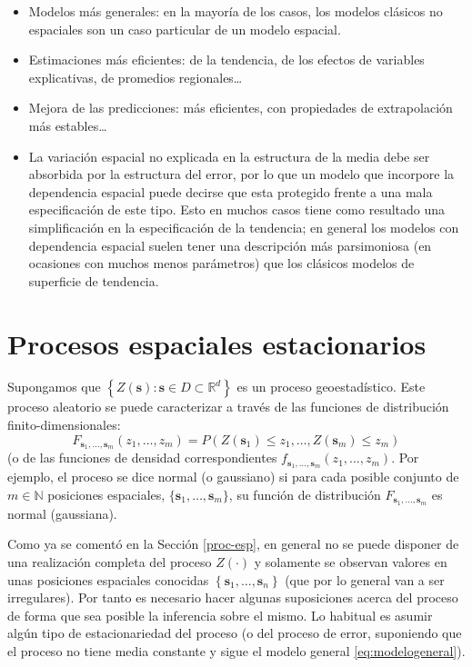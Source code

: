 \documentclass[
]{book}
\theoremstyle{break}
\theoremstyle{definition}
\theoremstyle{definition}
\theoremstyle{definition}
\theoremstyle{definition}
\theoremstyle{remark}
\begin{document}
\begin{itemize}
\item
  Modelos más generales: en la mayoría de los casos, los modelos clásicos no espaciales son un caso particular de un modelo espacial.
\item
  Estimaciones más eficientes: de la tendencia, de los efectos de variables explicativas, de promedios regionales\ldots{}
\item
  Mejora de las predicciones: más eficientes, con propiedades de extrapolación más estables\ldots{}
\item
  La variación espacial no explicada en la estructura de la media debe ser absorbida por la estructura del error, por lo que un modelo que incorpore la dependencia espacial puede decirse que esta protegido frente a una mala especificación de este tipo. Esto en muchos casos tiene como resultado una simplificación en la especificación de la tendencia; en general los modelos con dependencia espacial suelen tener una descripción más parsimoniosa (en ocasiones con muchos menos parámetros) que los clásicos modelos de superficie de tendencia.
\end{itemize}

\section{Procesos espaciales estacionarios}\label{procesos-estacionarios}

Supongamos que \(\left\{ Z(\mathbf{s}) : \mathbf{s} \in D \subset \mathbb{R}^{d} \right\}\) es un proceso geoestadístico.
Este proceso aleatorio se puede caracterizar a través de las funciones de distribución finito-dimensionales:
\[F_{\mathbf{s}_1, \ldots, \mathbf{s}_m}(z_1, \ldots, z_m)
= P\left(Z(\mathbf{s}_1)\leq z_1 , \ldots,Z(\mathbf{s}_m)\leq z_m \right)\]
(o de las funciones de densidad correspondientes \(f_{\mathbf{s}_1, \ldots, \mathbf{s}_m}(z_1, \ldots, z_m)\).
Por ejemplo, el proceso se dice normal (o gaussiano) si para cada posible conjunto de \(m \in \mathbb{N}\) posiciones espaciales, \(\{\mathbf{s}_1, \ldots, \mathbf{s}_m\}\), su función de distribución \(F_{\mathbf{s}_1, \ldots, \mathbf{s}_m}\) es normal (gaussiana).

Como ya se comentó en la Sección \ref{proc-esp}, en general no se puede disponer de una realización completa del proceso \(Z(\cdot)\) y solamente se observan valores en unas posiciones espaciales conocidas \(\left\{ \mathbf{s}_1, \ldots, \mathbf{s}_{n} \right\}\) (que por lo general van a ser irregulares).
Por tanto es necesario hacer algunas suposiciones acerca del proceso de forma que sea posible la inferencia sobre el mismo.
Lo habitual es asumir algún tipo de estacionariedad del proceso (o del proceso de error, suponiendo que el proceso no tiene media constante y sigue el modelo general \eqref{eq:modelogeneral}).
\end{document}
